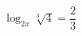 \begin{ex}[type=equation]
	\begin{condition}
		$\log_{2x} \sqrt[3]{4} = \dfrac{2}{3}$
	\end{condition}
\end{ex}